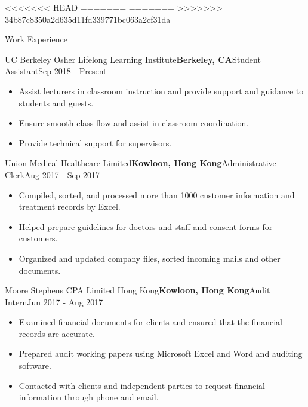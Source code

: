 \documentclass{resume}
\begin{document}


<<<<<<< HEAD
=======
=======
>>>>>>> 34b87c8350a2d635d11fd339771bc063a2cf31da

\begin{rSection}{Work Experience}

\begin{rSubsection}{UC Berkeley Osher Lifelong Learning Institute}{\bf {Berkeley, CA}}{Student Assistant}{Sep 2018 - Present}
\begin{itemize}
    \item Assist lecturers in classroom instruction and provide support and guidance to students and guests.
    \item Ensure smooth class flow and assist in classroom coordination.
    \item Provide technical support for supervisors.
\end{itemize}
\end{rSubsection}

\begin{rSubsection}{Union Medical Healthcare Limited}{\bf {Kowloon, Hong Kong}}{Administrative Clerk}{Aug 2017 - Sep 2017}
\begin{itemize}
    \item Compiled, sorted, and processed more than 1000 customer information and treatment records by Excel.
    \item Helped prepare guidelines for doctors and staff and consent forms for customers.
    \item Organized and updated company files, sorted incoming mails and other documents.
\end{itemize}
\end{rSubsection}

\begin{rSubsection}{Moore Stephens CPA Limited Hong Kong}{\bf {Kowloon, Hong Kong}}{Audit Intern}{Jun 2017 - Aug 2017}
\begin{itemize}
    \item Examined financial documents for clients and ensured that the financial records are accurate.
    \item Prepared audit working papers using Microsoft Excel and Word and auditing software.
    \item Contacted with clients and independent parties to request financial information through phone and email.
\end{itemize}
\end{rSubsection}


\end{rSection}
\end{document}
\end{rSection}
\end{document}
